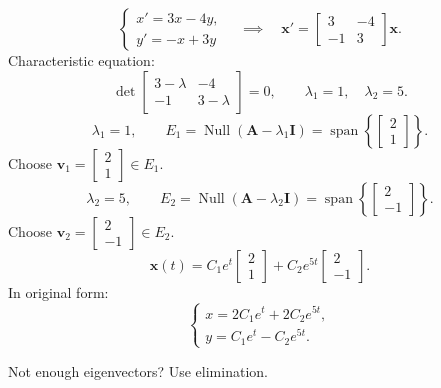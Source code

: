 \begin{example}
  \[
    \begin{cases}
      x'=3x-4y, \\
      y'=-x+3y
    \end{cases}
    \quad\implies\quad
    \mathbf{x}'=
    \begin{bmatrix}
      3 & -4 \\-1&3
    \end{bmatrix}
    \mathbf{x}.
  \]
  Characteristic equation:
  \[
    \det
    \begin{bmatrix}
      3-\lambda & -4 \\-1&3-\lambda
    \end{bmatrix}
    =0,
    \qquad \lambda_1=1,\quad\lambda_2=5.
  \]
  \[
    \lambda_1=1,\qquad
    E_1=\operatorname{Null}(\mathbf{A}-\lambda_1\mathbf{I})
    =\operatorname{span}\left\{
    \begin{bmatrix}
      2 \\1
    \end{bmatrix}
    \right\}.
  \]
  Choose $\mathbf{v}_1=
    \begin{bmatrix}
      2 \\1
    \end{bmatrix}
    \in E_1$.
  \[
    \lambda_2=5,\qquad
    E_2=\operatorname{Null}(\mathbf{A}-\lambda_2\mathbf{I})
    =\operatorname{span}\left\{
    \begin{bmatrix}
      2 \\-1
    \end{bmatrix}
    \right\}.
  \]
  Choose $\mathbf{v}_2=
    \begin{bmatrix}
      2 \\-1
    \end{bmatrix}
    \in E_2$.
  \[
    \mathbf{x}(t)=C_1e^t
    \begin{bmatrix}
      2 \\1
    \end{bmatrix}
    +C_2e^{5t}
    \begin{bmatrix}
      2 \\-1
    \end{bmatrix}
    .
  \]
  In original form:
  \[
    \begin{cases}
      x=2C_1e^t+2C_2e^{5t}, \\
      y=C_1e^t-C_2e^{5t}.
    \end{cases}
  \]
\end{example}

Not enough eigenvectors? Use elimination.

